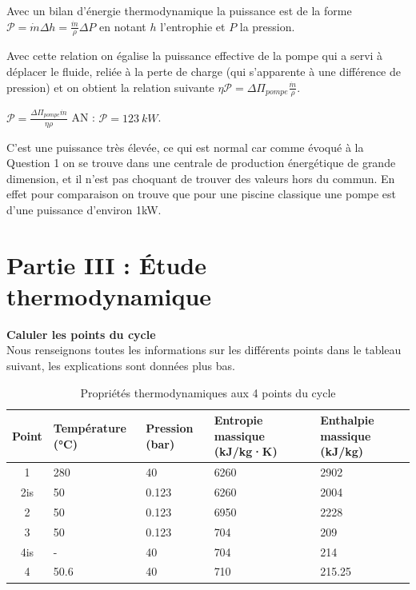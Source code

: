 \documentclass[12pt]{article}
\begin{document}
Avec un bilan d'énergie thermodynamique la puissance est de la forme $\mathcal P = \dot m \Delta h = \frac{\dot m}{\rho} \Delta P$ en notant $h$ l'entrophie et $P$ la pression.

Avec cette relation on égalise la puissance effective de la pompe qui a servi à déplacer le fluide, reliée à la perte de charge (qui s'apparente à une différence de pression) et on obtient la relation suivante $\eta \mathcal P = \Delta \Pi_{pompe} \frac{\dot m}{\rho}$.

$\boxed{\mathcal P = \frac{\Delta \Pi_{pompe} \dot m }{\eta \rho}}$ AN : $\mathcal P = 123 \ kW$.

C'est une puissance très élevée, ce qui est normal car comme évoqué à la Question 1 on se trouve dans une centrale de production énergétique de grande dimension, et il n'est pas choquant de trouver des valeurs hors du commun. En effet pour comparaison on trouve que pour une piscine classique une pompe est d'une puissance d'environ 1kW.

\section*{Partie III : Étude thermodynamique}

\textbf{Caluler les points du cycle}
\\
Nous renseignons toutes les informations sur les différents points dans le tableau suivant, les explications sont données plus bas.

\begin{table}[h!]
\centering
\begin{tabularx}{\textwidth}{|c|X|X|X|X|}
\hline
\textbf{Point} & \textbf{Température (°C)} & \textbf{Pression (bar)} & \textbf{Entropie massique (kJ/kg·K)} & \textbf{Enthalpie massique (kJ/kg)} \\
\hline
1 & 280 & 40 & 6260 & 2902 \\
\hline
2is & 50 & 0.123 & 6260 & 2004 \\
\hline
2 & 50 & 0.123 & 6950 & 2228 \\
\hline
3 & 50 & 0.123 & 704 & 209 \\
\hline
4is & - & 40 & 704 & 214 \\
\hline
4 & 50.6 & 40 & 710 & 215.25 \\
\hline
\end{tabularx}
\caption{Propriétés thermodynamiques aux 4 points du cycle}
\label{tab:points_thermo}
\end{table}
\end{document}
